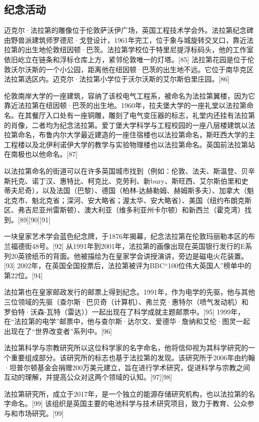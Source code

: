 \subsection{纪念活动}
迈克尔·法拉第的雕像位于伦敦萨沃伊广场，英国工程技术学会外。法拉第纪念碑由野兽派建筑师罗德尼·戈登设计，1961年完工，位于象与城旋转交叉口，靠近法拉第的出生地伦敦纽因顿·巴茨。法拉第学校位于特里尼提浮标码头，他的工作室依旧屹立在链条和浮标仓库上方，紧邻伦敦唯一的灯塔。[85] 法拉第花园是位于伦敦沃尔沃斯的一个小公园，距离他在纽因顿·巴茨的出生地不远。它位于南华克区法拉第选区内。迈克尔·法拉第小学位于沃尔沃斯的艾尔斯伯里庄园。[86]

伦敦南岸大学的一座建筑，容纳了该校电气工程系，被命名为法拉第翼楼，因为它靠近法拉第在纽因顿·巴茨的出生地。1960年，拉夫堡大学的一座礼堂以法拉第命名。在其餐厅入口处有一座铜雕，雕刻了电气变压器的标志，礼堂内还挂有法拉第的肖像，二者均为纪念法拉第。爱丁堡大学科学与工程校园的一座八层楼建筑以法拉第命名，布鲁内尔大学最近建造的一座住宿楼也以法拉第命名，斯旺西大学的主工程楼以及北伊利诺伊大学的教学与实验物理楼也以法拉第命名。英国前法拉第站在南极也以他命名。[87]

以法拉第命名的街道可以在许多英国城市找到（例如：伦敦、法夫、斯温登、贝辛斯托克、诺丁汉、惠特比、柯克比、克劳利、新bury、斯旺西、艾尔斯伯里和史蒂夫尼奇），以及法国（巴黎）、德国（柏林-达赫勒姆、赫姆斯多夫）、加拿大（魁北克市、魁北克省；深河、安大略省；渥太华、安大略省）、美国（纽约布朗克斯区、弗吉尼亚州雷斯顿）、澳大利亚（维多利亚州卡尔顿）和新西兰（霍克湾）找到。[89][90][91]

一块皇家艺术学会蓝色纪念牌，于1876年揭幕，纪念法拉第在伦敦玛丽勒本区的布兰福德街48号。[92] 从1991年到2001年，法拉第的画像出现在英国银行发行的E系列20英镑纸币的背面。他被描绘为在皇家学会讲授演讲，旁边是磁电火花装置。[93] 2002年，在英国全国投票后，法拉第被评为BBC“100位伟大英国人”榜单中的第22位。[94]

法拉第也在皇家邮政发行的邮票上得到纪念。1991年，作为电学的先驱，他与其他三位领域的先驱（查尔斯·巴贝奇（计算机）、弗兰克·惠特尔（喷气发动机）和罗伯特·沃森-瓦特（雷达））一起出现在了科学成就主题邮票中。[95] 1999年，在“法拉第的电学”邮票中，他与查尔斯·达尔文、爱德华·詹纳和艾伦·图灵一起出现在了“世界改变者”系列中。[96]

法拉第科学与宗教研究所以这位科学家的名字命名，他将信仰视为其科学研究的一个重要组成部分。该研究所的标志也基于法拉第的发现。该研究所于2006年由约翰·坦普尔顿基金会捐赠200万美元建立，旨在进行学术研究，促进科学与宗教之间互动的理解，并提高公众对这两个领域的认知。[97][98]

法拉第研究所，成立于2017年，是一个独立的能源存储研究机构，也以法拉第的名字命名。[99] 该组织是英国主要的电池科学与技术研究项目，致力于教育、公众参与和市场研究。[99]

